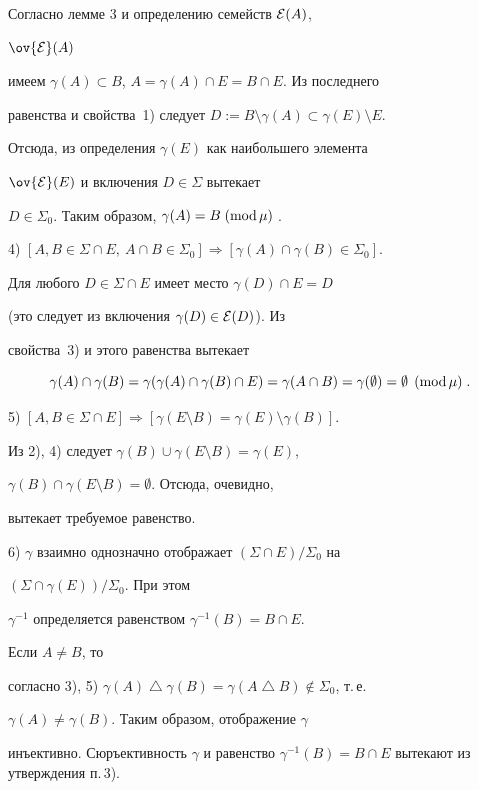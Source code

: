 \begin{pf}
Согласно лемме 3 и определению семейств ${\cal E}(A)$,


$\ov{\cal E}(A)$


имеем $\gamma(A)\subset B$, $A=\gamma(A)\cap E=B\cap E$. Из последнего


равенства и свойства~1) следует $D:=


B\setminus\gamma(A)\subset\gamma(E)\setminus E$.


Отсюда, из определения $\gamma(E)$ как наибольшего элемента


$\ov{\cal E}(E)$ и включения $D\in\Sigma$ вытекает


$D\in\Sigma_0$. Таким образом, $\gamma(A)=B\;(\mathrm{mod}\,\mu)\;$.





4) $[A,B\in\Sigma\cap E,\ A\cap B\in\Sigma_0]\Rightarrow[


\gamma(A)\cap\gamma(B)\in\Sigma_0]$.





Для любого $D\in\Sigma\cap E$ имеет место $\gamma(D)\cap E=D$


(это следует из включения $\gamma(D)\in{\cal E}(D)$). Из


свойства~3) и этого равенства вытекает


$$


\gamma(A)\cap\gamma(B)=\gamma(\gamma(A)\cap\gamma(B)\cap E)=


\gamma(A\cap B)=\gamma(\emptyset)=\emptyset\,\moddd.


$$





5) $[A,B\in\Sigma\cap E]\Rightarrow


[\gamma(E\setminus B)=\gamma(E)\setminus\gamma(B)]$.





Из 2), 4) следует $\gamma(B)\cup\gamma(E\setminus B)=\gamma(E)$,


$\gamma(B)\cap\gamma(E\setminus B)=\emptyset$. Отсюда, очевидно,


вытекает требуемое равенство.





6) $\gamma$ взаимно однозначно отображает $(\Sigma\cap E)/\Sigma_0$ на


$(\Sigma\cap\gamma(E))/\Sigma_0$. При этом


$\gamma^{-1}$ определяется равенством $\gamma^{-1}(B)=B\cap E$.





Если $A\ne B$, то


согласно 3), 5)\; $\gamma(A)\bigtriangleup\gamma(B)=\gamma(A\bigtriangleup


B)\notin\Sigma_0$, т.\,е.


$\gamma(A)\ne\gamma(B)$. Таким образом, отображение $\gamma$


инъективно. Сюръективность $\gamma$ и равенство $\gamma^{-1}(B)=B\cap


E$ вытекают из утверждения п.\,3).


\end{pf}
